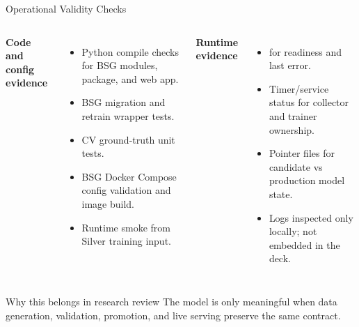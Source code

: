 \documentclass[aspectratio=169]{beamer}
\begin{document}
\begin{frame}[shrink=4]{Operational Validity Checks}
\begin{columns}[T,onlytextwidth]
\textbf{Code and config evidence}
\begin{itemize}
  \item Python compile checks for BSG modules, package, and web app.
  \item BSG migration and retrain wrapper tests.
  \item CV ground-truth unit tests.
  \item BSG Docker Compose config validation and image build.
  \item Runtime smoke from Silver training input.
\end{itemize}

\textbf{Runtime evidence}
\begin{itemize}
  \item {} for readiness and last error.
  \item Timer/service status for collector and trainer ownership.
  \item Pointer files for candidate vs production model state.
  \item Logs inspected only locally; not embedded in the deck.
\end{itemize}
\end{columns}
\tightsep
\begin{block}{Why this belongs in research review}
\small The model is only meaningful when data generation, validation, promotion, and live serving preserve the same contract.
\end{block}
\end{frame}
\end{document}
